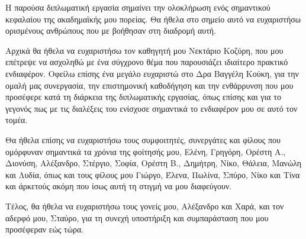 \begin{acknowledgementsgr}
  Η παρούσα διπλωματική εργασία σημαίνει την ολοκλήρωση ενός σημαντικού κεφαλαίου της ακαδημαϊκής μου πορείας. Θα ήθελα στο σημείο αυτό να ευχαριστήσω ορισμένους ανθρώπους που με βοήθησαν στη διαδρομή αυτή.

  Αρχικά θα ήθελα να ευχαριστήσω τον καθηγητή μου Νεκτάριο Κοζύρη, που μου επέτρεψε να ασχοληθώ με ένα σύγχρονο θέμα που παρουσιάζει ιδιαίτερο πρακτικό ενδιαφέρον. Οφείλω επίσης ένα μεγάλο ευχαριστώ στο Δρα Βαγγέλη Κούκη, για την ομαλή μας συνεργασία, την επιστημονική καθοδήγηση και την ενθάρρυνση που μου προσέφερε κατά τη διάρκεια της διπλωματικής εργασίας, όπως επίσης και για το γεγονός πως με τις διαλέξεις του ενίσχυσε σημαντικά το ενδιαφέρον μου σε αυτό τον τομέα.

  Θα ήθελα επίσης να ευχαριστήσω τους συμφοιτητές, συνεργάτες και φίλους που ομόρφυναν σημαντικά τα χρόνια της φοίτησής μου, Ελένη, Γρηγόρη, Ορέστη Α., Διονύση, Αλέξανδρο, Στέργιο, Σοφία, Ορέστη Β., Δημήτρη, Νίκο, Θάλεια, Μανώλη και Λυδία, όπως και τους φίλους μου Γιώργο, Έλενα, Πωλίνα, Σπύρο, Νίκο και Τίνα και άρκετούς ακόμη που ίσως αυτή τη στιγμή να μου διαφεύγουν.

  Τέλος, θα ήθελα να ευχαριστήσω τους γονείς μου, Αλέξανδρο και Χαρά, και τον αδερφό μου, Σταύρο, για τη συνεχή υποστήριξη και συμπαράσταση που μου προσέφεραν εώς τώρα.
\end{acknowledgementsgr}
